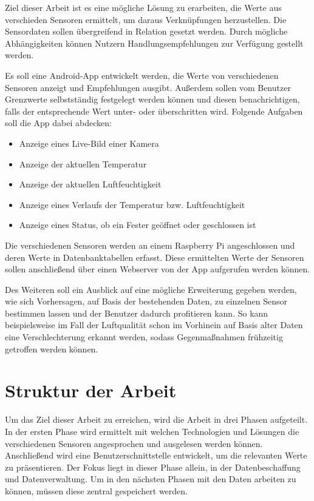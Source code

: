 Ziel dieser Arbeit ist es eine mögliche Lösung zu erarbeiten, die Werte aus verschieden Sensoren ermittelt, um daraus Verknüpfungen herzustellen. Die Sensordaten sollen übergreifend in Relation gesetzt werden. Durch mögliche Abhängigkeiten können Nutzern Handlungsempfehlungen zur Verfügung gestellt werden.

Es soll eine Android-App entwickelt werden, die Werte von verschiedenen Sensoren anzeigt und Empfehlungen ausgibt. Außerdem sollen vom Benutzer Grenzwerte selbstständig festgelegt werden können und diesen benachrichtigen, falls der entsprechende Wert unter- oder überschritten wird. 
Folgende Aufgaben soll die App dabei abdecken:
\begin{itemize}
	\item Anzeige eines Live-Bild einer Kamera
	\item Anzeige der aktuellen Temperatur
	\item Anzeige der aktuellen Luftfeuchtigkeit
	\item Anzeige eines Verlaufs der Temperatur bzw. Luftfeuchtigkeit
	\item Anzeige eines Status, ob ein Fester geöffnet oder geschlossen ist
\end{itemize} 
Die verschiedenen Sensoren werden an einem Raspberry Pi angeschlossen und deren Werte in Datenbanktabellen erfasst. Diese ermittelten Werte der Sensoren sollen anschließend über einen Webserver von der App aufgerufen werden können.

Des Weiteren soll ein Ausblick auf eine mögliche Erweiterung gegeben werden, wie sich Vorhersagen, auf Basis der bestehenden Daten, zu einzelnen Sensor bestimmen lassen und der Benutzer dadurch profitieren kann. So kann beispielsweise im Fall der Luftqualität schon im Vorhinein auf Basis alter Daten eine Verschlechterung erkannt werden, sodass Gegenmaßnahmen frühzeitig getroffen werden können.
\section{Struktur der Arbeit}
Um das Ziel dieser Arbeit zu erreichen, wird die Arbeit in drei Phasen aufgeteilt. In der ersten Phase wird ermittelt mit welchen Technologien und Lösungen die verschiedenen Sensoren angesprochen und ausgelesen werden können. Anschließend wird eine Benutzerschnittstelle entwickelt, um die relevanten Werte zu präsentieren. Der Fokus liegt in dieser Phase allein, in der Datenbeschaffung und Datenverwaltung. Um in den nächsten Phasen mit den Daten arbeiten zu können, müssen diese zentral gespeichert werden.

